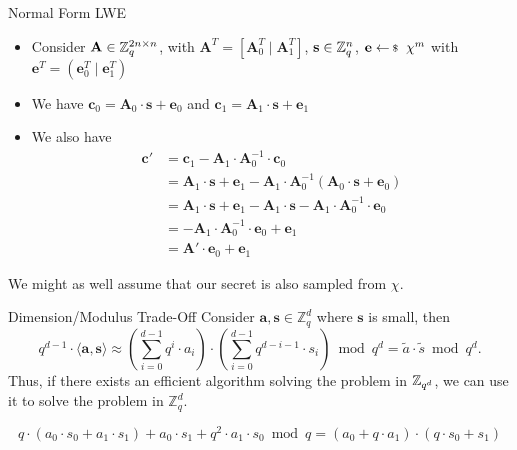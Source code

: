 \documentclass[xcolor=table,10pt,aspectratio=169]{beamer}
\renewcommand{\vec}[1]{\ensuremath{\mathbf{#1}}\xspace}
\newcommand{\mat}[1]{\ensuremath{\vec{#1}}\xspace}
\begin{document}
\begin{frame}[label={sec:org2d8be9b}]{Normal Form LWE}
\begin{itemize}
\item Consider \(\mat{A} \in \ZZ_q^{2n \times n}\), with \(\mat{A}^T = \left[\mat{A}_0^T \mid \mat{A}_1^T\right]\), \(\vec{s} \in \ZZ_q^n\), \(\vec{e} \sample \chi^m\) with \(\vec{e}^T = \left(\vec{e}_0^T \mid \vec{e}_1^T\right)\)

\item We have \(\vec{c}_0 = \mat{A}_0 \cdot \vec{s} + \vec{e}_0\) and \(\vec{c}_1 = \vec{A}_1 \cdot \vec{s} + \vec{e}_1\)

\item We also have
\begin{align*}
\vec{c}' &= \vec{c}_1 - \mat{A}_1 \cdot \mat{A}_0^{-1} \cdot \vec{c}_0\\
   &= \vec{A}_1\cdot \vec{s} + \vec{e}_1 -  \mat{A}_1 \cdot \mat{A}_0^{-1} (\mat{A}_0 \cdot \vec{s} + \vec{e}_0)\\
   &= \vec{A}_1\cdot \vec{s} + \vec{e}_1 -  \mat{A}_1 \cdot \vec{s} -  \mat{A}_1 \cdot \mat{A}_0^{-1} \cdot \vec{e}_0\\
   &= - \mat{A}_1 \cdot \mat{A}_0^{-1} \cdot \vec{e}_0 + \vec{e}_1\\
   &= \mat{A}' \cdot \vec{e}_0 + \vec{e}_1
\end{align*}
\end{itemize}

\begin{block}{\cite{C:ACPS09}}
We might as well assume that our secret is also sampled from \(\chi\).
\end{block}
\end{frame}

\begin{frame}[label={sec:org93d4f7b}]{Dimension/Modulus Trade-Off}
Consider \(\vec{a}, \vec{s} \in \mathbb{Z}_{q}^{d}\) where \(\vec{s}\) is small, then
\[q^{d-1} \cdot \langle{\vec{a},\vec{s}}\rangle \approx \left(\sum_{i=0}^{d-1} q^{i} \cdot a_{i}\right) \cdot \left(\sum_{i=0}^{d-1} q^{d-i-1} \cdot s_{i}\right) \bmod q^{d} = \tilde{a} \cdot \tilde{s} \bmod q^{d}.\]
Thus, if there exists an efficient algorithm solving the problem in \(\mathbb{Z}_{q^d}\), we can use it to solve the problem in \(\mathbb{Z}_{q}^d\). 

\begin{example}[\(\ZZ_{q^{2}}\)]
\[q\cdot \left(a_{0}\cdot s_{0} + a_{1} \cdot s_{1}\right) + a_{0} \cdot s_{1} + q^{2} \cdot a_{1} \cdot s_{0} \bmod q = \left(a_{0} + q\cdot a_{1}\right) \cdot (q\cdot s_{0} + s_{1})\]
\end{example}

\end{frame}
\end{document}
